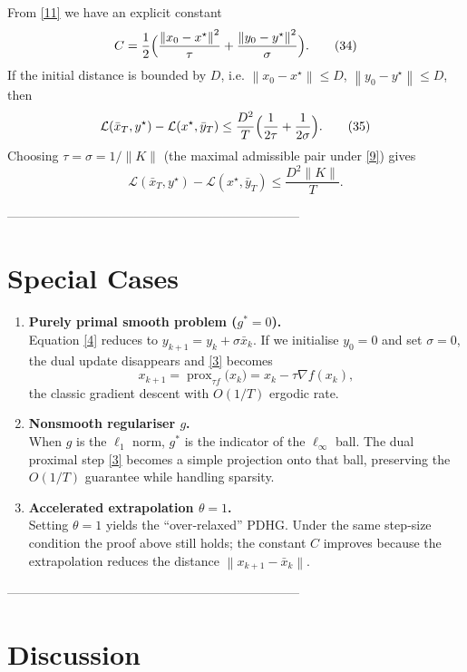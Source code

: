 \documentclass{article}
\newcommand{\prox}{\operatorname{prox}}
\newcommand{\norm}[1]{\left\|#1\right\|}
\begin{document}
From \eqref{11} we have an explicit constant
\[
C=\frac{1}{2}\Bigl(
\frac{\norm{x_{0}-x^{\star}}^{2}}{\tau}
+\frac{\norm{y_{0}-y^{\star}}^{2}}{\sigma}
\Bigr).
\tag{34}
\]
If the initial distance is bounded by $D$, i.e. $\norm{x_{0}-x^{\star}}\le D$, $\norm{y_{0}-y^{\star}}\le D$, then
\[
\mathcal{L}(\bar{x}_{T},y^{\star})-\mathcal{L}(x^{\star},\bar{y}_{T})\le
\frac{D^{2}}{T}\Bigl(\frac{1}{2\tau}+\frac{1}{2\sigma}\Bigr).
\tag{35}
\]
Choosing $\tau=\sigma=1/\|K\|$ (the maximal admissible pair under \eqref{9}) gives
\[
\mathcal{L}(\bar{x}_{T},y^{\star})-\mathcal{L}(x^{\star},\bar{y}_{T})\le
\frac{D^{2}\|K\|}{T}.
\tag{36}
\]

---------------------------------------------------------------------

\section*{Special Cases}

\begin{enumerate}[label=\alph*.]
\item \textbf{Purely primal smooth problem ($g^{*}=0$).}\\
Equation \eqref{4} reduces to $y_{k+1}=y_{k}+\sigma \bar{x}_{k}$.
If we initialise $y_{0}=0$ and set $\sigma=0$, the dual update disappears and \eqref{3} becomes
\[
x_{k+1}= \prox_{\tau f}\bigl(x_{k}\bigr)
= x_{k}-\tau \nabla f(x_{k}),
\]
the classic gradient descent with $O(1/T)$ ergodic rate.

\item \textbf{Nonsmooth regulariser $g$.}\\
When $g$ is the $\ell_{1}$ norm, $g^{*}$ is the indicator of the $\ell_{\infty}$ ball.
The dual proximal step \eqref{3} becomes a simple projection onto that ball, preserving the $O(1/T)$ guarantee while handling sparsity.

\item \textbf{Accelerated extrapolation $\theta=1$.}\\
Setting $\theta=1$ yields the ``over‑relaxed'' PDHG. Under the same step‑size condition the proof above still holds; the constant $C$ improves because the extrapolation reduces the distance $\norm{x_{k+1}-\bar{x}_{k}}$.

\end{enumerate}

---------------------------------------------------------------------

\section*{Discussion}
\end{document}
